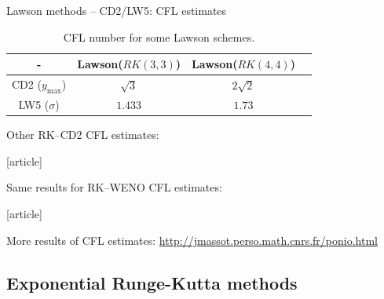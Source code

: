\documentclass{beamer}
\newcommand{\customcite}[1]{\cite{#1}}
\begin{document}
\begin{frame}{Lawson methods -- CD2/LW5: CFL estimates}
  \begin{table}
    \centering
    \begin{tabular}{|c|c|c|c|}
      \hline
      - & Lawson($RK(3,3)$) & Lawson($RK(4,4)$) \\
      \hline
      CD2 ($y_{\max}$) & $\sqrt{3}$ & $2\sqrt{2}$\\
      \hline
      LW5 ($\sigma$) & $1.433$   & $1.73$   \\
      \hline  
    \end{tabular}
    \caption{CFL number for some Lawson schemes.}
  \end{table}
  Other RK--CD2 CFL estimates:
\begin{thebibliography}{9}
  [article]
  \bibitem{} \customcite{Baldauf:2008}
\end{thebibliography}
  Same results for RK--WENO CFL estimates:
\begin{thebibliography}{9}
  [article]
  \bibitem{} \customcite{Motamed:2010}
  \bibitem{} \customcite{Lunet:2017}
\end{thebibliography}
  More results of CFL estimates:
  \url{http://jmassot.perso.math.cnrs.fr/ponio.html}
\end{frame}

\subsection{Exponential Runge-Kutta methods}
\end{document}

